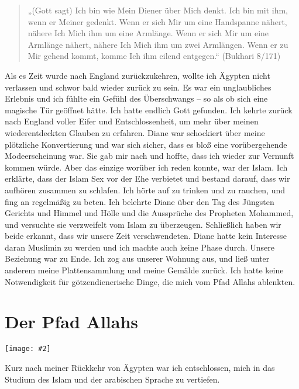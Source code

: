 \documentclass[12pt]{memoir}
\newcommand{\img}[3]{\begin{center}%
\texttt{[image: \#2]}\\{\small\em#3}%
\end{center}}
\begin{document}
\begin{quote}
„(Gott sagt) Ich bin wie Mein Diener über Mich denkt.
Ich bin mit ihm, wenn er Meiner gedenkt.
Wenn er sich Mir um eine Handspanne nähert,
nähere Ich Mich ihm um eine Armlänge.
Wenn er sich Mir um eine Armlänge nähert,
nähere Ich Mich ihm um zwei Armlängen.
Wenn er zu Mir gehend kommt, komme Ich ihm eilend entgegen.“
(Bukhari 8/171)
\end{quote}

Als es Zeit wurde nach England zurückzukehren,
wollte ich Ägypten nicht verlassen und schwor bald wieder zurück zu sein.
Es war ein unglaubliches Erlebnis und ich fühlte ein Gefühl des Überschwangs –
so als ob sich eine magische Tür geöffnet hätte.
Ich hatte endlich Gott gefunden.
Ich kehrte zurück nach England voller Eifer und Entschlossenheit,
um mehr über meinen wiederentdeckten Glauben zu erfahren.
Diane war schockiert über meine plötzliche Konvertierung und war sich sicher,
dass es bloß eine vorübergehende Modeerscheinung war.
Sie gab mir nach und hoffte, dass ich wieder zur Vernunft kommen würde.
Aber das einzige worüber ich reden konnte, war der Islam.
Ich erklärte, dass der Islam Sex vor der Ehe verbietet und bestand darauf,
dass wir aufhören zusammen zu schlafen.
Ich hörte auf zu trinken und zu rauchen, und fing an regelmäßig zu beten.
Ich belehrte Diane über den Tag des Jüngsten Gerichts und Himmel und Hölle
und die Aussprüche des Propheten Mohammed,
und versuchte sie verzweifelt vom Islam zu überzeugen.
Schließlich haben wir beide erkannt, dass wir unsere Zeit verschwendeten.
Diane hatte kein Interesse daran Muslimin zu werden
und ich machte auch keine Phase durch.
Unsere Beziehung war zu Ende.
Ich zog aus unserer Wohnung aus,
und ließ unter anderem meine Plattensammlung und meine Gemälde zurück.
Ich hatte keine Notwendigkeit
für götzendienerische Dinge, die mich vom Pfad Allahs ablenkten.


\chapter{Der Pfad Allahs}

\img{scale=1}{Hassan_1980.jpg}{}

Kurz nach meiner Rückkehr von Ägypten war ich entschlossen,
mich in das Studium des Islam und der arabischen Sprache zu vertiefen.
\end{document}
